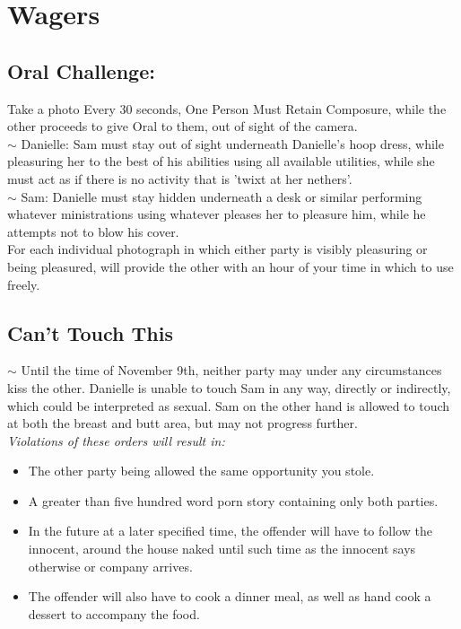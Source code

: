 
 \section{Wagers}
 \subsection{Oral Challenge:}
 \begin{samepage}
Take a photo Every 30 seconds, One Person Must Retain Composure, while the other proceeds to give Oral to them, 
out of sight of the camera.\\
  \indent $\sim$ \hspace{5mm} Danielle: Sam must stay out of sight underneath Danielle's hoop dress, while pleasuring 
  her to the best of his abilities using all available utilities, while she must
  act as if there is no activity that is 'twixt at her nethers'.\\
 \indent  $\sim$ \hspace{5mm}Sam: Danielle must stay hidden underneath a desk or similar performing whatever ministrations using 
  whatever pleases her to pleasure him, while he attempts not to blow his cover.\\

 
  For each individual photograph in which either party is visibly pleasuring or being pleasured, will provide the other 
  with an hour of your time in which to use freely.
 \end{samepage}

 \subsection{Can't Touch This}
\begin{samepage}
   \indent $\sim$ Until the time of November 9th, neither party may under any circumstances kiss the other. Danielle is 
   unable to touch Sam in any way, directly or indirectly, which could be interpreted as sexual. Sam on the other hand is
    allowed to touch at both the breast and butt area, but may not progress further. \\
    \textit{ Violations of these orders will result in: } 
    \begin{itemize}
      \item The other party being allowed the same opportunity you stole.
      \item A greater than five hundred word porn story containing only both parties.
      \item In the future at a later specified time, the offender will have to follow the innocent,
      around the house naked until such time as the innocent says otherwise or company arrives.
      \item The offender will also have to cook a dinner meal, as well as hand cook a dessert to
       accompany the food.  
    \end{itemize}
\end{samepage}
 

